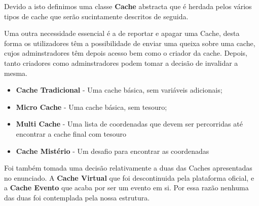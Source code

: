 \documentclass{article}
\begin{document}
Devido a isto definimos uma classe \textbf{Cache} abstracta que é herdada pelos vários tipos de cache que serão sucintamente descritos de seguida.

Uma outra necessidade essencial é a de reportar e apagar uma Cache, desta forma os utilizadores têm a possibilidade de enviar uma queixa sobre uma cache, cujos adminstradores têm depois acesso bem como o criador da cache.
Depois, tanto criadores como adminstradores podem tomar a decisão de invalidar a mesma.

\begin{itemize}
  \item \textbf{Cache Tradicional} - Uma cache básica, sem variáveis adicionais;
  \item \textbf{Micro Cache} - Uma cache básica, sem tesouro;
  \item \textbf{Multi Cache} - Uma lista de coordenadas que devem ser percorridas até encontrar a cache final com tesouro
  \item \textbf{Cache Mistério} - Um desafio para encontrar as coordenadas
\end{itemize}

Foi também tomada uma decisão relativamente a duas das Caches apresentadas no enunciado.
A \textbf{Cache Virtual} que foi descontinuida pela plataforma oficial, e a \textbf{Cache Evento} que acaba por ser um evento em si.
Por essa razão nenhuma das duas foi contemplada pela nossa estrutura.

\pagebreak
\end{document}

